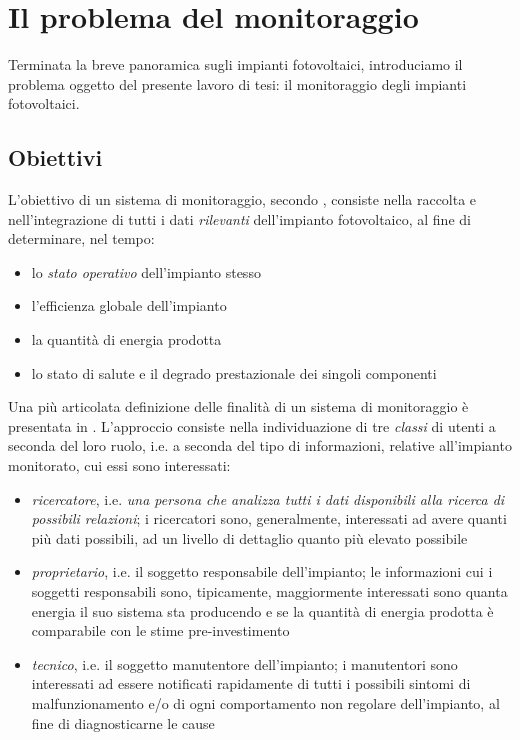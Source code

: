 %
\chapter{Il problema del monitoraggio}
Terminata la breve panoramica sugli impianti fotovoltaici, introduciamo il 
problema oggetto del presente lavoro di tesi: il monitoraggio degli 
impianti fotovoltaici.
%

%
\section{Obiettivi}
L'obiettivo di un sistema di monitoraggio, secondo \cite{dirks06}, consiste 
nella raccolta e nell'integrazione di tutti i dati \emph{rilevanti} dell'impianto 
fotovoltaico, al fine di determinare, nel tempo:
%
\begin{itemize}
\item lo \emph{stato operativo} dell'impianto stesso
\item l'efficienza globale dell'impianto
\item la quantit\`a di energia prodotta
\item lo stato di salute e il degrado prestazionale dei singoli componenti
\end{itemize}
%

%
Una pi\`u articolata definizione delle finalit\`a di un sistema di monitoraggio
\`e presentata in \cite{kolodenny08}. L'approccio consiste nella 
individuazione di tre \emph{classi} di utenti a seconda del loro ruolo, i.e.
a seconda del tipo di informazioni, relative all'impianto monitorato,
cui essi sono interessati:
%
\begin{itemize}
\item \emph{ricercatore}, i.e. \emph{una persona che analizza tutti i dati disponibili 
alla ricerca di possibili relazioni}; i ricercatori sono, generalmente, interessati 
ad avere quanti pi\`u dati possibili, ad un livello di dettaglio quanto pi\`u elevato
possibile
%
\item \emph{proprietario}, i.e. il soggetto responsabile dell'impianto; le informazioni
cui i soggetti responsabili sono, tipicamente, maggiormente interessati sono 
quanta energia il suo sistema sta producendo e  se la quantit\`a di energia 
prodotta \`e comparabile con le stime pre-investimento
%
\item \emph{tecnico}, i.e. il soggetto manutentore dell'impianto; i manutentori sono
interessati ad essere notificati rapidamente di tutti i possibili sintomi di malfunzionamento 
e/o di ogni comportamento non regolare dell'impianto, al fine di diagnosticarne le cause
\end{itemize}
%

